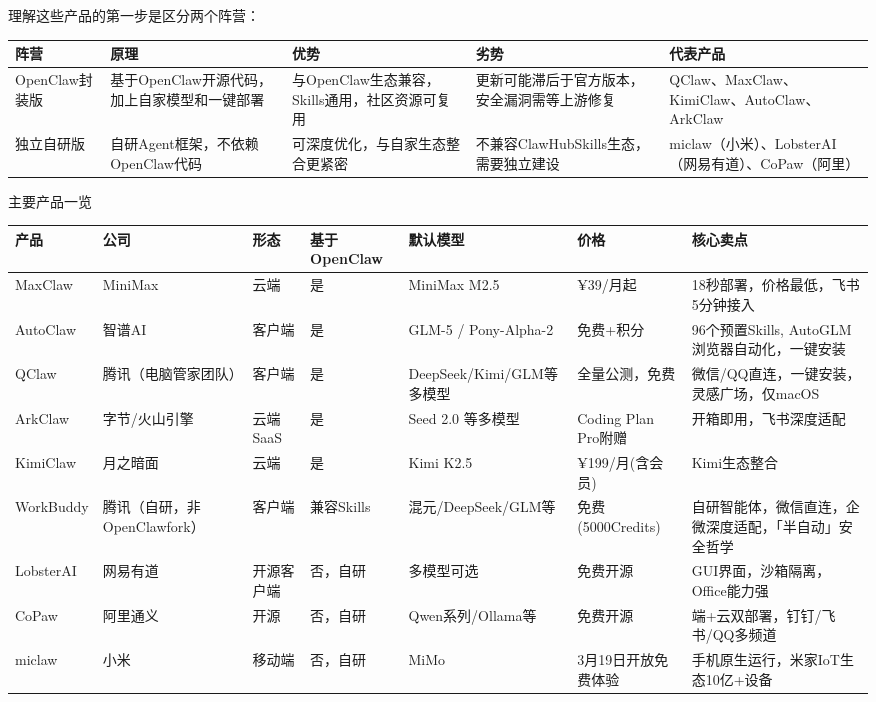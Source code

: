 \documentclass[
  10
]{article}
\newcounter{none} %
\begin{document}
理解这些产品的第一步是区分两个阵营：

{\def\LTcaptype{none} %
\begin{longtable}[]{@{}|l|l|l|l|l|@{}}
\toprule\noalign{}
\endhead
\bottomrule\noalign{}
\endlastfoot
\hline
阵营 & 原理 & 优势 & 劣势 & 代表产品 \\
\hline
OpenClaw封装版 & 基于OpenClaw开源代码，加上自家模型和一键部署 &
与OpenClaw生态兼容，Skills通用，社区资源可复用 &
更新可能滞后于官方版本，安全漏洞需等上游修复 &
QClaw、MaxClaw、KimiClaw、AutoClaw、ArkClaw \\
\hline
独立自研版 & 自研Agent框架，不依赖OpenClaw代码 &
可深度优化，与自家生态整合更紧密 & 不兼容ClawHubSkills生态，需要独立建设
& miclaw（小米）、LobsterAI（网易有道）、CoPaw（阿里） \\
\hline
\end{longtable}
}

主要产品一览

{\def\LTcaptype{none} %
\begin{longtable}[]{@{}|l|l|l|l|l|l|l|@{}}
\toprule\noalign{}
\endhead
\bottomrule\noalign{}
\endlastfoot
\hline
产品 & 公司 & 形态 & 基于 OpenClaw & 默认模型 & 价格 & 核心卖点 \\
\hline
MaxClaw & MiniMax & 云端 & 是 & MiniMax M2.5 & ¥39/月起 &
18秒部署，价格最低，飞书5分钟接入 \\
\hline
AutoClaw & 智谱AI & 客户端 & 是 & GLM-5 / Pony-Alpha-2 & 免费+积分 &
96个预置Skills, AutoGLM浏览器自动化，一键安装 \\
\hline
QClaw & 腾讯（电脑管家团队） & 客户端 & 是 & DeepSeek/Kimi/GLM等多模型 &
全量公测，免费 & 微信/QQ直连，一键安装，灵感广场，仅macOS \\
\hline
ArkClaw & 字节/火山引擎 & 云端SaaS & 是 & Seed 2.0 等多模型 & Coding
Plan Pro附赠 & 开箱即用，飞书深度适配 \\
\hline
KimiClaw & 月之暗面 & 云端 & 是 & Kimi K2.5 & ¥199/月(含会员) &
Kimi生态整合 \\
\hline
WorkBuddy & 腾讯（自研，非OpenClawfork） & 客户端 & 兼容Skills &
混元/DeepSeek/GLM等 & 免费(5000Credits) &
自研智能体，微信直连，企微深度适配，「半自动」安全哲学 \\
\hline
LobsterAI & 网易有道 & 开源客户端 & 否，自研 & 多模型可选 & 免费开源 &
GUI界面，沙箱隔离，Office能力强 \\
\hline
CoPaw & 阿里通义 & 开源 & 否，自研 & Qwen系列/Ollama等 & 免费开源 &
端+云双部署，钉钉/飞书/QQ多频道 \\
\hline
miclaw & 小米 & 移动端 & 否，自研 & MiMo & 3月19日开放免费体验 &
手机原生运行，米家IoT生态10亿+设备 \\
\hline
\end{longtable}
}
\end{document}
